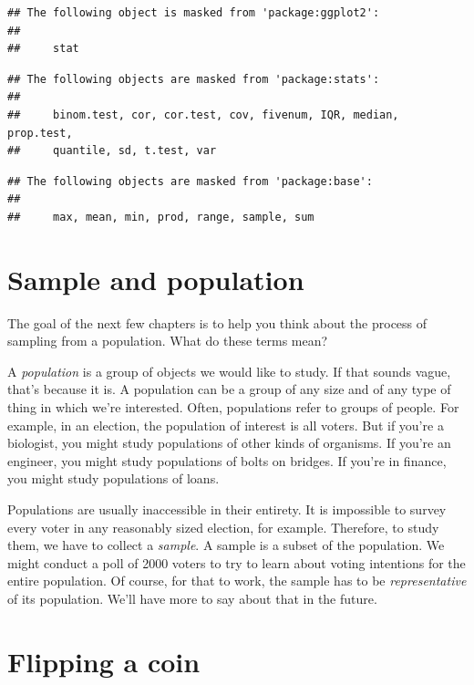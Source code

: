 \documentclass[
]{book}
\begin{document}
\begin{verbatim}
## The following object is masked from 'package:ggplot2':
## 
##     stat
\end{verbatim}

\begin{verbatim}
## The following objects are masked from 'package:stats':
## 
##     binom.test, cor, cor.test, cov, fivenum, IQR, median, prop.test,
##     quantile, sd, t.test, var
\end{verbatim}

\begin{verbatim}
## The following objects are masked from 'package:base':
## 
##     max, mean, min, prod, range, sample, sum
\end{verbatim}

\hypertarget{randomization1-sample-pop}{%
\section{Sample and population}\label{randomization1-sample-pop}}

The goal of the next few chapters is to help you think about the process of sampling from a population. What do these terms mean?

A \emph{population} is a group of objects we would like to study. If that sounds vague, that's because it is. A population can be a group of any size and of any type of thing in which we're interested. Often, populations refer to groups of people. For example, in an election, the population of interest is all voters. But if you're a biologist, you might study populations of other kinds of organisms. If you're an engineer, you might study populations of bolts on bridges. If you're in finance, you might study populations of loans.

Populations are usually inaccessible in their entirety. It is impossible to survey every voter in any reasonably sized election, for example. Therefore, to study them, we have to collect a \emph{sample}. A sample is a subset of the population. We might conduct a poll of 2000 voters to try to learn about voting intentions for the entire population. Of course, for that to work, the sample has to be \emph{representative} of its population. We'll have more to say about that in the future.

\hypertarget{randomization1-coin}{%
\section{Flipping a coin}\label{randomization1-coin}}
\end{document}
